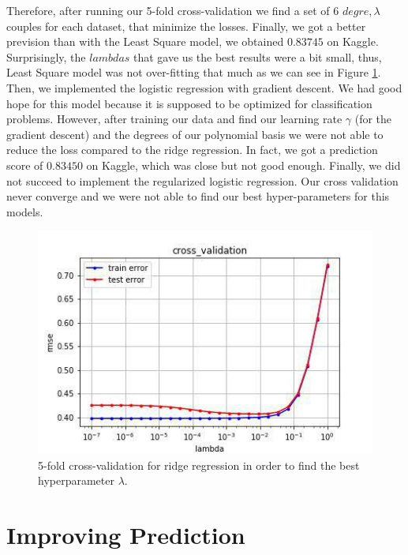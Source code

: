 \documentclass[10pt,conference,compsocconf]{IEEEtran}
\begin{document}
Therefore, after running our 5-fold cross-validation we find a set of 6 $degre, \lambda$ couples for each dataset, that minimize the losses. Finally, we got a better prevision than with the Least Square model, we obtained $0.83745$ on Kaggle. Surprisingly, the $lambdas$ that gave us the best results were a bit small, thus, Least Square model was not over-fitting that much as we can see in Figure \ref{fig:figure1}.
Then, we implemented the logistic regression with gradient descent. We had good hope for this model because it is supposed to be optimized for classification problems. However, after training our data and find our learning rate $\gamma$ (for the gradient descent) and the degrees of our polynomial basis we were not able to reduce the loss compared to the ridge regression. In fact, we got a prediction score of $0.83450$ on Kaggle, which was close but not good enough.
Finally, we did not succeed to implement the regularized logistic regression. Our cross validation never converge and we were not able to find our best hyper-parameters for this models.

\begin{figure}[tbp]
  \centering
  \includegraphics[width=\columnwidth]{cross-validation}
  \caption{5-fold cross-validation for ridge regression in order to find the best hyperparameter $\lambda$.}
  \vspace{-3mm}
  \label{fig:figure1}
\end{figure}

\section{Improving Prediction}
\end{document}
